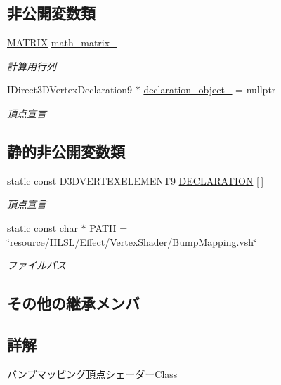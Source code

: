 \subsection*{非公開変数類}
\begin{DoxyCompactItemize}
\item 
\mbox{\hyperlink{_matrix_8h_a032295cd9fb1b711757c90667278e744}{M\+A\+T\+R\+IX}} \mbox{\hyperlink{class_vertex_shader_bump_mapping_a2d2de356dd9f615ed927f8ff315f8ad0}{math\+\_\+matrix\+\_\+}}
\begin{DoxyCompactList}\small\item\em 計算用行列 \end{DoxyCompactList}\item 
I\+Direct3\+D\+Vertex\+Declaration9 $\ast$ \mbox{\hyperlink{class_vertex_shader_bump_mapping_a6e45d81a2a9c8ba7071b7f2686264a49}{declaration\+\_\+object\+\_\+}} = nullptr
\begin{DoxyCompactList}\small\item\em 頂点宣言 \end{DoxyCompactList}\end{DoxyCompactItemize}
\subsection*{静的非公開変数類}
\begin{DoxyCompactItemize}
\item 
static const D3\+D\+V\+E\+R\+T\+E\+X\+E\+L\+E\+M\+E\+N\+T9 \mbox{\hyperlink{class_vertex_shader_bump_mapping_ae4b0d38d68dc86b47ae17693cb214e06}{D\+E\+C\+L\+A\+R\+A\+T\+I\+ON}} \mbox{[}$\,$\mbox{]}
\begin{DoxyCompactList}\small\item\em 頂点宣言 \end{DoxyCompactList}\item 
static const char $\ast$ \mbox{\hyperlink{class_vertex_shader_bump_mapping_aa4b686f9aeb9e327ca79adf5974bc86d}{P\+A\+TH}} = \char`\"{}resource/H\+L\+SL/Effect/Vertex\+Shader/Bump\+Mapping.\+vsh\char`\"{}
\begin{DoxyCompactList}\small\item\em ファイルパス \end{DoxyCompactList}\end{DoxyCompactItemize}
\subsection*{その他の継承メンバ}


\subsection{詳解}
バンプマッピング頂点シェーダー\+Class 

